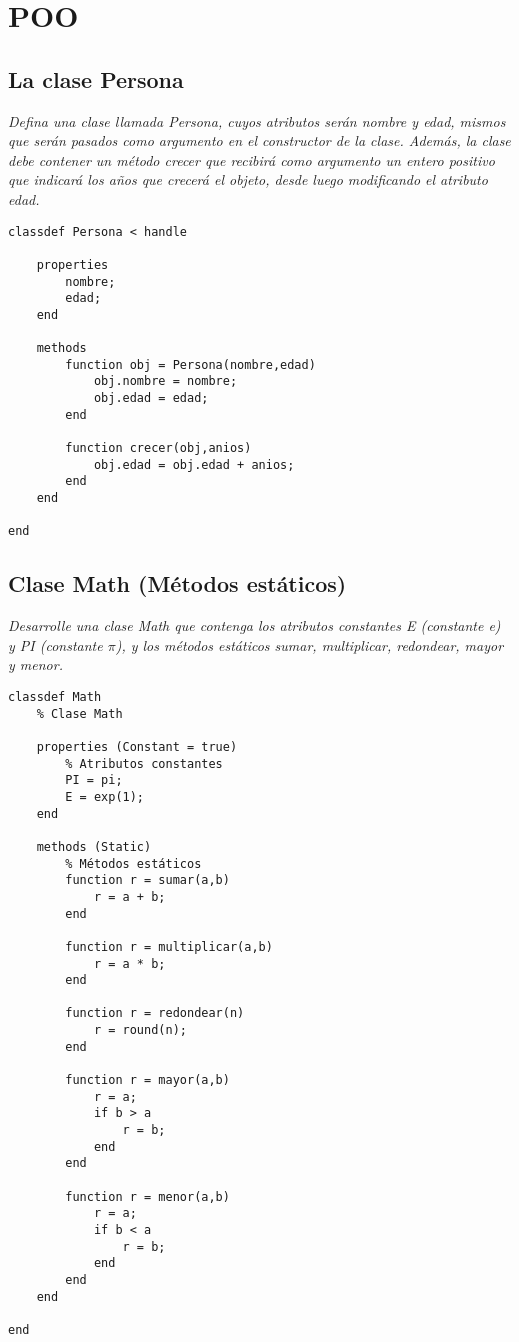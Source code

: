 \chapter{POO}

\section{La clase Persona}

\textit{Defina una clase llamada Persona, cuyos atributos serán nombre y edad, mismos que serán pasados como argumento en el constructor de la clase. Además, la clase debe contener un método crecer que recibirá como argumento un entero positivo que indicará los años que \textit{crecerá} el objeto, desde luego modificando el atributo edad.}


\begin{verbatim}
classdef Persona < handle
    
    properties
        nombre;
        edad;
    end
    
    methods
        function obj = Persona(nombre,edad)
            obj.nombre = nombre;
            obj.edad = edad;
        end
        
        function crecer(obj,anios)
            obj.edad = obj.edad + anios;
        end
    end
    
end
\end{verbatim}


\section{Clase Math (Métodos estáticos)}

\textit{Desarrolle una clase Math que contenga los atributos constantes E (constante e) y PI (constante $\pi$), y los métodos estáticos sumar, multiplicar, redondear, mayor y menor.}



\begin{verbatim}
classdef Math
    % Clase Math
    
    properties (Constant = true)
        % Atributos constantes
        PI = pi;
        E = exp(1);
    end
    
    methods (Static)
        % Métodos estáticos
        function r = sumar(a,b)
            r = a + b;
        end
        
        function r = multiplicar(a,b)
            r = a * b;
        end
        
        function r = redondear(n)
            r = round(n);
        end
        
        function r = mayor(a,b)
            r = a;
            if b > a
                r = b;
            end
        end
        
        function r = menor(a,b)
            r = a;
            if b < a
                r = b;
            end
        end
    end
    
end  
\end{verbatim}
